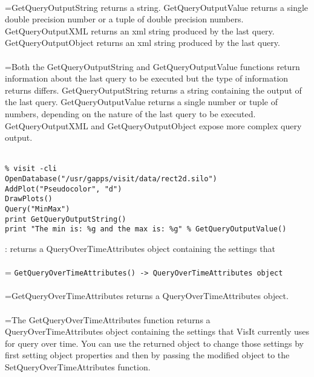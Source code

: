 \documentclass[10pt,a4paper]{report}
\begin{document}
 \\ 
\hangindent=\parindent GetQueryOutputString returns a string. GetQueryOutputValue returns a single double precision number or a tuple of double precision numbers. GetQueryOutputXML returns an xml string produced by the last query. GetQueryOutputObject returns an xml string produced by the last query. \\[-3mm] 

 \\ 
\hangindent=\parindent Both the GetQueryOutputString and GetQueryOutputValue functions return information about the last query to be executed but the type of information returns differs. GetQueryOutputString returns a string containing the output of the last query. GetQueryOutputValue returns a single number or tuple of numbers, depending on the nature of the last query to be executed.  GetQueryOutputXML and GetQueryOutputObject expose more complex query output. \\[-3mm] 

\\[-6mm]
\begin{verbatim}% visit -cli
OpenDatabase("/usr/gapps/visit/data/rect2d.silo")
AddPlot("Pseudocolor", "d")
DrawPlots()
Query("MinMax")
print GetQueryOutputString()
print "The min is: %g and the max is: %g" % GetQueryOutputValue()
\end{verbatim}
\newpage


{}
: returns a QueryOverTimeAttributes object containing the settings that\\[-3mm]

 \\ 
\hangindent=\parindent 
\verb!GetQueryOverTimeAttributes() -> QueryOverTimeAttributes object!\\ [-3mm]

 \\ 
\hangindent=\parindent GetQueryOverTimeAttributes returns a QueryOverTimeAttributes object. \\[-3mm] 

 \\ 
\hangindent=\parindent The GetQueryOverTimeAttributes function returns a QueryOverTimeAttributes object containing the settings that VisIt currently uses for query over time. You can use the returned object to change those settings by first setting object properties and then by passing the modified object to the SetQueryOverTimeAttributes function. \\[-3mm] 
\end{document}
